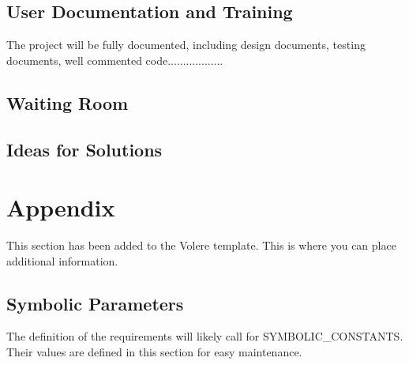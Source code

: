 \documentclass[12pt, titlepage]{article}
\begin{document}
  \subsection{User Documentation and Training}
  The project will be fully documented, including design documents, testing documents, well commented code..................

  \subsection{Waiting Room}

  \subsection{Ideas for Solutions}





\newpage

\section{Appendix}

This section has been added to the Volere template.  This is where you can
place additional information.

\subsection{Symbolic Parameters}

The definition of the requirements will likely call for SYMBOLIC\_CONSTANTS.
Their values are defined in this section for easy maintenance.
\end{document}
